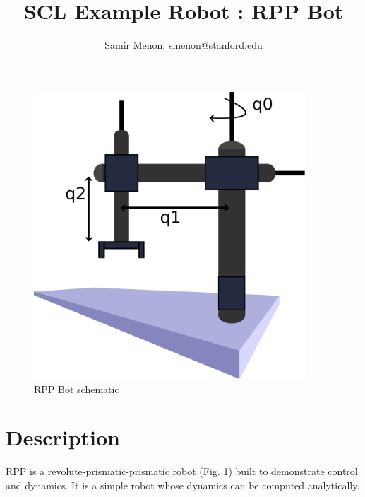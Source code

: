\documentclass[12pt]{article}
\title{SCL Example Robot : RPP Bot}
\author{Samir Menon, smenon@stanford.edu}
\begin{document}
\maketitle


\begin{figure}[ht!]
\begin{center}
\includegraphics[width=4in]{figs/rpp.pdf}
\caption{RPP Bot schematic}
\label{fig:rppbot}
\end{center}
\end{figure}


\section{Description}
RPP is a revolute-prismatic-prismatic robot (Fig. \ref{fig:rppbot}) built to
demonstrate control and dynamics. It is a simple robot whose dynamics can be
computed analytically.
\end{document}
